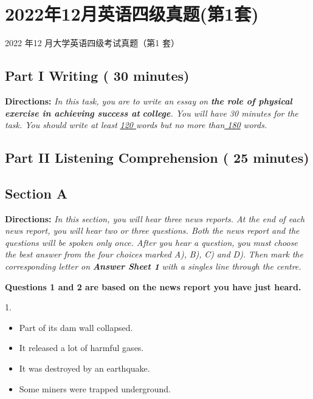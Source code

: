 \documentclass[UTF8,11pt]{ctexart}
\begin{document}
\section*{2022年12月英语四级真题(第1套)}
2022 年12 月大学英语四级考试真题（第1 套）


\subsection*{\textbf{Part I} \textbf{Writing} \textbf{( 30 minutes)}}


\textbf{Directions:}\textit{ In this task, you are to write an essay on }\textbf{\textit{the role of physical exercise in achieving success at}} \textbf{\textit{college}}\textit{. You will have 30 minutes for the task. You should write at least }\textit{\uline{120 }}\textit{words but no more than}\textit{\uline{ 180}} \textit{words.}


\subsection*{\textbf{Part II} \textbf{Listening Comprehension} \textbf{( 25 minutes)}}


\subsection*{\textbf{Section A}}


\textbf{Directions:} \textit{In this section, you will hear three news reports. At the end of each news report, you will hear two} \textit{or three questions. Both the news report and the questions will be spoken only once. After you hear a question,} \textit{you} \textit{must} \textit{choose} \textit{the} \textit{best} \textit{answer} \textit{from} \textit{the} \textit{four} \textit{choices} \textit{marked} \textit{A),} \textit{B),} \textit{C)} \textit{and} \textit{D).} \textit{Then} \textit{mark} \textit{the} \textit{corresponding letter on }\textbf{\textit{Answer Sheet 1}}\textit{ with a singles line through the centre.}


\textbf{Questions 1 and 2 are based on the news report you have just heard.}


1.


\begin{itemize}[leftmargin=2em,itemsep=.2em,topsep=.4em]\item[A.] Part of its dam wall collapsed.
\item[B.] It released a lot of harmful gases.
\item[C.] It was destroyed by an earthquake.
\item[D.] Some miners were trapped underground.
\end{itemize}
\end{document}
